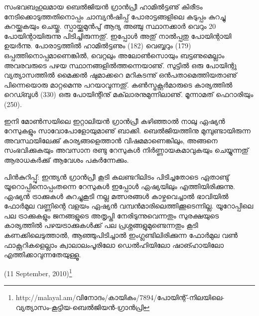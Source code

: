 സംഭവബഹുലമായ ബെല്‍ജിയന്‍ ഗ്രാന്‍പ്രീ ഹാമില്‍ട്ടണു് കിരീടം നേടിക്കൊടുത്തതിനൊപ്പം ചാമ്പ്യന്‍ഷിപ്പ് 
പോരാട്ടങ്ങളിലെ കടുപ്പം കുറച്ചു കുറയ്ക്കുകയും ചെയ്തു. സ്പായ്ക്കുമുന്‍പു് ആദ്യ അഞ്ചു സ്ഥാനക്കാര്‍ വെറും 20 പോയിന്റായിരുന്നു 
പിടിച്ചിരുന്നതു്. ഇപ്പോള്‍ അതു് നാല്‍പ്പതു പോയിന്റായി ഉയര്‍ന്നു. പോരാട്ടത്തില്‍ ഹാമില്‍ട്ടണും (182) വെബ്ബറും (179) 
ഒപ്പത്തിനൊപ്പമാണെങ്കില്‍, വെറ്റലും അലോണ്‍സൊയും ബട്ടണുമെല്ലാം അവരവരുടെ പഴയ സ്ഥാനങ്ങളില്‍ത്തന്നെയാണു്.
സുട്ടില്‍ ഒരു പോയിന്റു വ്യത്യാസത്തില്‍ മൈക്കല്‍ ഷുമാക്കറെ മറികടന്നു് ഒന്‍പതാമെത്തിയതാണു് പിന്നെയൊരു 
മാറ്റമെന്നു പറയാവുന്നതു്. കണ്‍സ്ട്രക്റ്റര്‍മാരുടെ കാര്യത്തില്‍ റെഡ്ബുള്‍ (330) ഒരു പോയിന്റിനു് മക്‌ലാരനുമുന്നിലാണു്. 
മൂന്നാമത് ഫെറാരിയും (250).

ഇനി മോണ്‍സയിലെ ഇറ്റാലിയന്‍ ഗ്രാന്‍പ്രീ കഴിഞ്ഞാല്‍ നാലു ഏഷ്യന്‍ റേസുകളും സാവോപോളോയുമാണു് ബാക്കി. 
ബെല്‍ജിയത്തിനു മുമ്പുണ്ടായിരുന്ന അവസ്ഥയിലേക്കു് കാര്യങ്ങളെത്താന്‍ വിഷമമാണെങ്കിലും, അങ്ങനെ 
സംഭവിക്കുകയും അവസാന രണ്ടു റേസുകള്‍ നിര്‍ണ്ണായകമാവുകയും ചെയ്യുന്നതു് ആരാധകര്‍ക്കു് ആവേശം 
പകര്‍ന്നേക്കും.

പിന്‍കുറിപ്പു്: ഇന്ത്യന്‍ ഗ്രാന്‍പ്രീ കൂടി കലണ്ടറിലിടം പിടിച്ചതോടെ ഏതാണ്ടു് യൂറൊപ്പിനൊപ്പംതന്നെ റേസുകള്‍ ഇപ്പോള്‍ 
ഏഷ്യയിലും എത്തിയിരിക്കുന്നു. ഏഷ്യന്‍ ട്രാക്കുകള്‍ കുറച്ചുകൂടി നല്ല മത്സരങ്ങള്‍ കാഴ്ചവെച്ചാല്‍ ഭാവിയില്‍ ഫോര്‍മുല 
വണ്ണിന്റെ വളയം ഏഷ്യന്‍ വമ്പന്‍മാരിലെത്തിക്കൂടെന്നില്ല. യൂറോപ്പിലെ പല ട്രാക്കുകളും ജനങ്ങളുടെ അതൃപ്തി 
നേരിടുന്നുവെന്നതും സുരക്ഷയുടെ കാര്യത്തില്‍ പഴയട്രാക്കുകള്‍ക്ക് പല പ്രശ്നങ്ങളുമുണ്ടെന്നതും കൂടി കണക്കിലെടുത്താല്‍,
ആഞ്ഞുപിടിച്ചാല്‍ ഇംഗ്ലണ്ടിലിരിക്കുന്ന ഫോര്‍മുല വണ്‍ ഫാക്റ്ററികളെല്ലാം ക്വാലാലംപൂരിലോ ഡെല്‍ഹിയിലോ 
ഷാങ്ഹായിലോ എത്തിക്കാവുന്നതേയുള്ളൂ.

\begin{flushright}(11 September, 2010)\footnote{http://malayal.am/വിനോദം/കായികം/7894/പോയിന്റ്-നിലയിലെ-വ്യത്യാസം-കൂട്ടിയ-ബെല്‍ജിയന്‍-ഗ്രാന്‍പ്രി}\end{flushright}

\newpage
